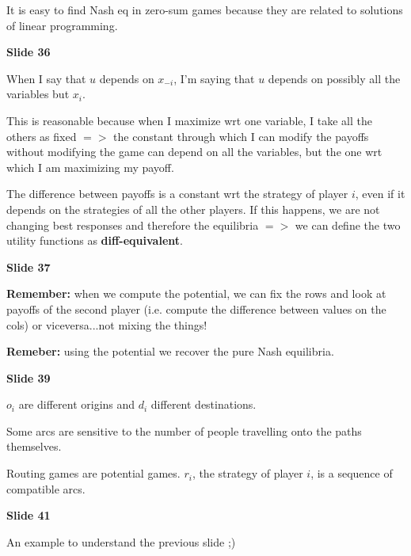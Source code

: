 
%


\noindent It is easy to find Nash eq in zero-sum games because they are 
related to solutions of linear programming.

\bigskip
\noindent \textbf{Slide 36}

\noindent When I say that $u$ depends on $x_{-i}$, I'm saying that $u$ 
depends on possibly all the variables but $x_i$.

\noindent This is reasonable because when I maximize wrt one variable, I 
take all the others as fixed $=>$ the constant through which I can modify 
the payoffs without modifying the game can depend on all the variables, but 
the one wrt which I am maximizing my payoff.

\noindent The difference between payoffs is a constant wrt the strategy 
of player $i$, even if it depends on the strategies of all the other 
players. If this happens, we are not changing best responses and therefore 
the equilibria $=>$ we can define the two utility functions as 
\textbf{diff-equivalent}.

\bigskip
\noindent \textbf{Slide 37}

\noindent \textbf{Remember:} when we compute the potential, we can fix 
the rows and look at payoffs of the second player (i.e. compute the 
difference between values on the cols) or viceversa...not mixing the 
things!

\noindent \textbf{Remeber:} using the potential we recover the pure Nash 
equilibria.

\bigskip
\noindent \textbf{Slide 39}

\noindent $o_i$ are different origins and $d_i$ different destinations. 

\noindent Some arcs are sensitive to the number of people travelling onto 
the paths themselves.

\noindent Routing games are potential games. $r_i$, the strategy of player 
$i$, is a sequence of compatible arcs.

\bigskip
\noindent \textbf{Slide 41}

\noindent An example to understand the previous slide ;)

